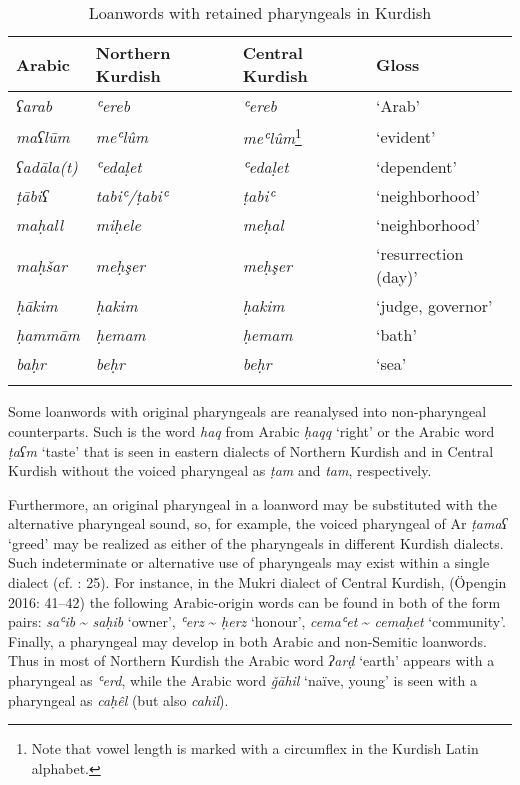 \documentclass[output=paper]{langsci/langscibook}
\begin{document}
\begin{table}
\begin{tabular}{llll}
\lsptoprule
{Arabic} & {Northern Kurdish} & {Central Kurdish} & {Gloss}\\\midrule
\textit{ʕarab}     & \textit{ʿereb}        & \textit{ʿereb}                    & ‘Arab’\\
\textit{maʕlūm}    & \textit{meʿlûm}       & \textit{meʿlûm}\footnote{Note that vowel length is marked with a circumflex in the Kurdish Latin alphabet.}    & ‘evident’\\
\textit{ʕadāla(t)} & \textit{ʿedaḷet}      & \textit{ʿedaḷet}                  & ‘dependent’\\
\textit{ṭābiʕ}     & \textit{tabiʿ/ṭabiʿ}  & \textit{ṭabiʿ}                    & ‘neighborhood’\\
\textit{maḥall}    & \textit{miḥele}       & \textit{meḥal}                    & ‘neighborhood’\\
\textit{maḥšar}    & \textit{meḥşer}       & \textit{meḥşer}                   & ‘resurrection (day)’\\
\textit{ḥākim}     & \textit{ḥakim}        & \textit{ḥakim}                    & ‘judge, governor’\\
\textit{ḥammām}    & \textit{ḥemam}        & \textit{ḥemam}                    & ‘bath’\\
\textit{baḥr}      & \textit{beḥr}         & \textit{beḥr}                     & ‘sea’\\
\lspbottomrule
\end{tabular}
\caption{\label{bkm:Ref14691447}Loanwords with retained pharyngeals in Kurdish}
\end{table}

Some loanwords with original pharyngeals are reanalysed into non-pharyngeal counterparts. Such is the word \textit{haq} from Arabic \textit{ḥaqq} ‘right’ or the Arabic word \textit{ṭaʕm} ‘taste’ that is seen in eastern dialects of Northern Kurdish and in Central Kurdish without the voiced pharyngeal as \textit{ṭam} and \textit{tam}, respectively. 

Furthermore, an original pharyngeal in a loanword may be substituted with the alternative pharyngeal sound, so, for example, the voiced pharyngeal of Ar \textit{ṭamaʕ} ‘greed’ may be realized as either of the pharyngeals in different Kurdish dialects. Such indeterminate or alternative use of pharyngeals may exist within a single dialect (cf. \citealt{Kahn1976}: 25). For instance, in the Mukri dialect of Central Kurdish, (Öpengin 2016: 41–42) the following Arabic-origin words can be found in both of the form pairs: \textit{saʿib} {\textasciitilde} \textit{saḥib} ‘owner’, \textit{ʿerz} {\textasciitilde} \textit{ḥerz} ‘honour’, \textit{cemaʿet} {\textasciitilde} \textit{cemaḥet} ‘community’. Finally, a pharyngeal may develop in both Arabic and non-Semitic loanwords. Thus in most of Northern Kurdish the Arabic word \textit{ʔarḍ} ‘earth’ appears with a pharyngeal as \textit{ʿerd}, while the Arabic word \textit{ǧāhil} ‘naïve, young’ is seen with a pharyngeal as \textit{caḥêl} (but also \textit{cahil}).    
\end{document}
